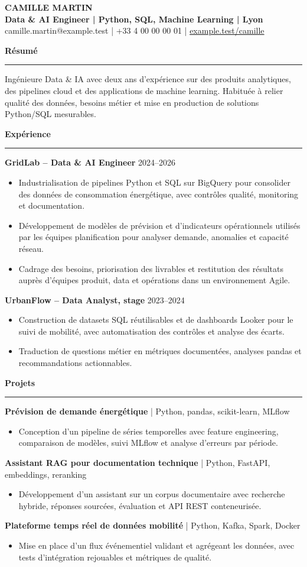 \documentclass[10.5pt,a4paper]{article}
\newcommand{\cvsection}[1]{\par\vspace{5pt}\textbf{\large #1}\par\vspace{1pt}\rule{\linewidth}{0.35pt}\vspace{2pt}}
\begin{document}
\begin{center}
{\Large\textbf{CAMILLE MARTIN}}\\[3pt]
\textbf{Data \& AI Engineer | Python, SQL, Machine Learning | Lyon}\\[3pt]
camille.martin@example.test \;|\; +33 4 00 00 00 01 \;|\; \href{https://example.test/camille}{example.test/camille}
\end{center}

\cvsection{Résumé}
Ingénieure Data \& IA avec deux ans d'expérience sur des produits analytiques, des pipelines cloud et des applications de machine learning. Habituée à relier qualité des données, besoins métier et mise en production de solutions Python/SQL mesurables.

\cvsection{Expérience}
\textbf{GridLab -- Data \& AI Engineer} \hfill 2024--2026
\begin{itemize}
\item Industrialisation de pipelines Python et SQL sur BigQuery pour consolider des données de consommation énergétique, avec contrôles qualité, monitoring et documentation.
\item Développement de modèles de prévision et d'indicateurs opérationnels utilisés par les équipes planification pour analyser demande, anomalies et capacité réseau.
\item Cadrage des besoins, priorisation des livrables et restitution des résultats auprès d'équipes produit, data et opérations dans un environnement Agile.
\end{itemize}
\textbf{UrbanFlow -- Data Analyst, stage} \hfill 2023--2024
\begin{itemize}
\item Construction de datasets SQL réutilisables et de dashboards Looker pour le suivi de mobilité, avec automatisation des contrôles et analyse des écarts.
\item Traduction de questions métier en métriques documentées, analyses pandas et recommandations actionnables.
\end{itemize}

\cvsection{Projets}
\textbf{Prévision de demande énergétique} | Python, pandas, scikit-learn, MLflow
\begin{itemize}
\item Conception d'un pipeline de séries temporelles avec feature engineering, comparaison de modèles, suivi MLflow et analyse d'erreurs par période.
\end{itemize}
\textbf{Assistant RAG pour documentation technique} | Python, FastAPI, embeddings, reranking
\begin{itemize}
\item Développement d'un assistant sur un corpus documentaire avec recherche hybride, réponses sourcées, évaluation et API REST conteneurisée.
\end{itemize}
\textbf{Plateforme temps réel de données mobilité} | Python, Kafka, Spark, Docker
\begin{itemize}
\item Mise en place d'un flux événementiel validant et agrégeant les données, avec tests d'intégration rejouables et métriques de qualité.
\end{itemize}
\end{document}

